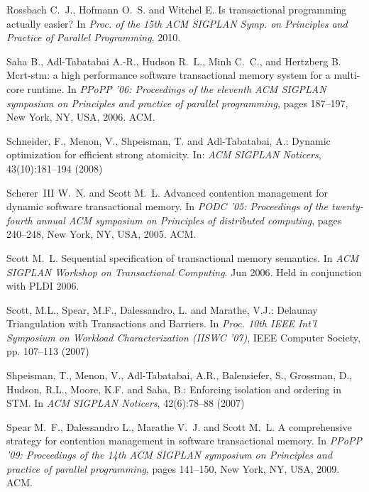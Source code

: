 \begin{thebibliography}{99}
{
Rossbach C.~J., Hofmann O.~S. and Witchel E.
\newblock Is transactional programming actually easier?
\newblock In {\em Proc. of the 15th ACM SIGPLAN Symp. on Principles and
  Practice of Parallel Programming}, 2010.


Saha B., Adl-Tabatabai A.-R., Hudson R.~L., Minh C.~C., and
  Hertzberg B.
\newblock Mcrt-stm: a high performance software transactional memory system for
  a multi-core runtime.
\newblock In {\em PPoPP '06: Proceedings of the eleventh ACM SIGPLAN symposium
  on Principles and practice of parallel programming}, pages 187--197, New
  York, NY, USA, 2006. ACM.




 Schneider, F., Menon, V., Shpeisman, T. and Adl-Tabatabai, A.:
 Dynamic optimization for efficient strong atomicity.
In: {\it ACM  SIGPLAN Noticers}, 43(10):181--194  (2008)

Scherer~III W.~N. and Scott M.~L.
\newblock Advanced contention management for dynamic software transactional
  memory.
\newblock In {\em PODC '05: Proceedings of the twenty-fourth annual ACM
  symposium on Principles of distributed computing}, pages 240--248, New York,
  NY, USA, 2005. ACM.




Scott M.~L.
\newblock Sequential specification of transactional memory semantics.
\newblock In {\em ACM SIGPLAN Workshop on Transactional Computing}. Jun 2006.
\newblock Held in conjunction with PLDI 2006.



 Scott, M.L.,  Spear, M.F., Dalessandro, L. and   Marathe, V.J.:
\newblock Delaunay Triangulation with Transactions and Barriers. 
\newblock In {\it Proc.  10th IEEE Int'l Symposium on Workload Characterization (IISWC '07)},
 IEEE Computer Society, pp. 107--113 (2007)



 Shpeisman, T.,  Menon, V.,  Adl-Tabatabai, A.R.,  Balensiefer, S.,  Grossman, D.,
 Hudson, R.L., Moore, K.F. and Saha, B.:
\newblock Enforcing isolation and ordering in STM. 
\newblock In {\it ACM  SIGPLAN Noticers}, 42(6):78--88  (2007)

Spear M.~F., Dalessandro L., Marathe V.~J. and  Scott M.~L.
\newblock A comprehensive strategy for contention management in software
  transactional memory.
\newblock In {\em PPoPP '09: Proceedings of the 14th ACM SIGPLAN symposium on
  Principles and practice of parallel programming}, pages 141--150, New York,
  NY, USA, 2009. ACM.


}
\end{thebibliography}
